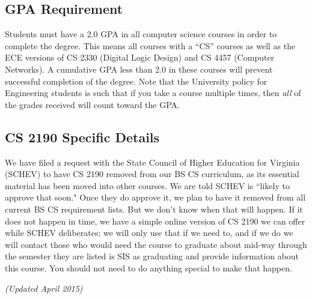 
\subsection{GPA Requirement}

Students must have a 2.0 GPA in all computer science courses in order to complete the degree.  This means all courses with a ``CS'' courses as well as the ECE versions of CS 2330 (Digital Logic Design) and CS 4457 (Computer Networks).  A cumulative GPA less than 2.0 in these courses will prevent successful completion of the degree.  Note that the University policy for Engineering students is such that if you take a course multiple times, then {\em all} of the grades received will count toward the GPA.

\subsection{CS 2190 Specific Details}

We have filed a request with the State Council of Higher Education for Virginia (SCHEV) to have CS 2190 removed from our BS CS curriculum, as its essential material has been moved into other courses. We are told SCHEV is ``likely to approve that soon." Once they do approve it, we plan to have it removed from all current BS CS requirement lists. But we don't know when that will happen. If it does not happen in time, we have a simple online version of CS 2190 we can offer while SCHEV deliberates; we will only use that if we need to, and if we do we will contact those who would need the course to graduate about mid-way through the semester they are listed is SIS as graduating and provide information about this course. You should not need to do anything special to make that happen.


\clearpage%
\begin{figure*}[h!]
{\em (Updated April 2015)}
\begin{center}
\end{center}
\end{figure*}
